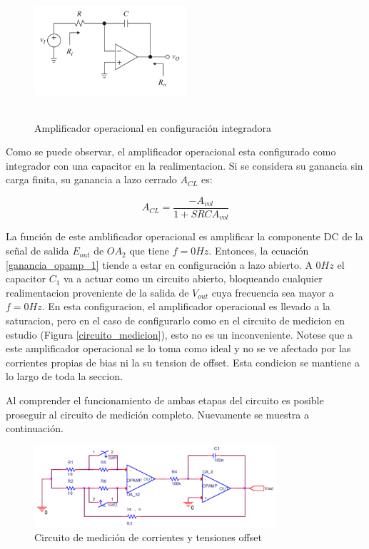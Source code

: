 \documentclass[12pt,a4paper]{article}
\begin{document}
\begin{figure}[ht]                                                       
    \centering\includegraphics[width=0.5\textwidth, height=5cm]{Figuras/fig_4.png}
     \caption{Amplificador operacional en configuración integradora}
     \label{fig_4}
     \end{figure}


Como se puede observar, el amplificador operacional esta configurado como integrador con una capacitor en la realimentacion. Si se considera su ganancia sin carga finita, su ganancia a lazo cerrado $A_{CL}$ es:

\begin{equation} A_{CL}= \frac{-A_{vol}}{1+SRC A_{vol}}  \label{ganancia_opamp_1} \end{equation}

La función de este amblificador operacional es amplificar la componente DC de la señal de salida $E_{out}$ de $OA_2$ que tiene $f=0Hz$. Entonces, la ecuación 
\ref{ganancia_opamp_1} tiende a estar en configuración a lazo abierto. A $0Hz$ el capacitor $C_{1}$ va a actuar como un circuito abierto, bloqueando cualquier realimentacion
proveniente de la salida de $V_{out}$ cuya frecuencia sea mayor a $f=0Hz$. En esta configuracion, el amplificador operacional es llevado a la saturacion, pero en el caso de configurarlo como en el circuito de medicion en estudio (Figura \ref{circuito_medicion}), esto no es 
un inconveniente. Notese que a este amplificador operacional se lo toma como ideal y no se ve afectado por las corrientes propias de bias ni la su tension de offset. Esta condicion se mantiene a lo largo de toda la seccion. 

Al comprender el funcionamiento de ambas etapas del circuito es posible proseguir al circuito de medición completo. Nuevamente se muestra a continuación.

\begin{figure}[ht]                                                       
    \centering\includegraphics[width=0.8\textwidth]{Figuras/circuito_medicion.png}
     \caption{Circuito de medición de corrientes y tensiones offset}
     \end{figure}
\end{document}
